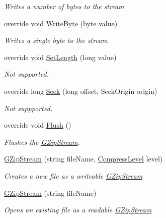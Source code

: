 \begin{DoxyCompactItemize}
\begin{DoxyCompactList}\small\item\em Writes a number of bytes to the stream \end{DoxyCompactList}\item 
override void \hyperlink{class_dot_z_lib_1_1_g_zip_stream_a78b38035956f42bf1c66db34ec2ba2cc}{Write\+Byte} (byte value)
\begin{DoxyCompactList}\small\item\em Writes a single byte to the stream \end{DoxyCompactList}\item 
override void \hyperlink{class_dot_z_lib_1_1_g_zip_stream_a05fff98b765251f87b41318781da71c4}{Set\+Length} (long value)
\begin{DoxyCompactList}\small\item\em Not supported. \end{DoxyCompactList}\item 
override long \hyperlink{class_dot_z_lib_1_1_g_zip_stream_adbb50684c05ca060cff804c91c63f4a2}{Seek} (long offset, Seek\+Origin origin)
\begin{DoxyCompactList}\small\item\em Not suppported. \end{DoxyCompactList}\item 
override void \hyperlink{class_dot_z_lib_1_1_g_zip_stream_a1e219fd4cc6c0f3c3bbd373f9724e24e}{Flush} ()
\begin{DoxyCompactList}\small\item\em Flushes the {\ttfamily \hyperlink{class_dot_z_lib_1_1_g_zip_stream}{G\+Zip\+Stream}}. \end{DoxyCompactList}\item 
\hyperlink{class_dot_z_lib_1_1_g_zip_stream_a12d73ef46491a5023b1fd620efb13f1a}{G\+Zip\+Stream} (string file\+Name, \hyperlink{namespace_dot_z_lib_a034f7a1ef9856d8834e6f6b1c53d8a4c}{Compress\+Level} level)
\begin{DoxyCompactList}\small\item\em Creates a new file as a writeable \hyperlink{class_dot_z_lib_1_1_g_zip_stream}{G\+Zip\+Stream} \end{DoxyCompactList}\item 
\hyperlink{class_dot_z_lib_1_1_g_zip_stream_aea152a18b8cab1ee3d614fc3799c7e08}{G\+Zip\+Stream} (string file\+Name)
\begin{DoxyCompactList}\small\item\em Opens an existing file as a readable \hyperlink{class_dot_z_lib_1_1_g_zip_stream}{G\+Zip\+Stream} \end{DoxyCompactList}\item 

\end{DoxyCompactItemize}
